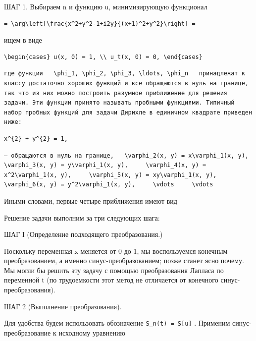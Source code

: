 \documentclass[
  ukrainian,
]{article}
\begin{document}
ШАГ 1. Выбираем n и функцию u, минимизирующую функционал

\begin{verbatim}
= \arg\left[\frac{x^2+y^2-1+i2y}{(x+1)^2+y^2}\right] =
\end{verbatim}

ищем в виде

\begin{verbatim}
\begin{cases} u(x, 0) = 1, \\ u_t(x, 0) = 0, \end{cases}
\end{verbatim}

\begin{verbatim}
где функции   \phi_1, \phi_2, \phi_3, \ldots, \phi_n   принадлежат к классу достаточно хороших функций и все обращаются в нуль на границе, так что из них можно построить разумное приближение для решения задачи. Эти функции принято называть пробными функциями. Типичный набор пробных функций для задачи Дирихле в единичном квадрате приведен ниже:
\end{verbatim}

\begin{verbatim}
x^{2} + y^{2} = 1,
\end{verbatim}

\begin{verbatim}
— обращаются в нуль на границе,   \varphi_2(x, y) = x\varphi_1(x, y),     \varphi_3(x, y) = y\varphi_1(x, y),     \varphi_4(x, y) = x^2\varphi_1(x, y),     \varphi_5(x, y) = xy\varphi_1(x, y),     \varphi_6(x, y) = y^2\varphi_1(x, y),     \vdots     \vdots
\end{verbatim}

Иными словами, первые четыре приближения имеют вид

Решение задачи выполним за три следующих шага:

ШАГ І (Определение подходящего преобразования.)

Поскольку переменная x меняется от 0 до 1, мы воспользуемся конечным
преобразованием, а именно синус-преобразованием; позже станет ясно
почему. Мы могли бы решить эту задачу с помощью преобразования Лапласа
по переменной t (по трудоемкости этот метод не отличается от конечного
синус-преобразования).

ШАГ 2 (Выполнение преобразования).

Для удобства будем использовать обозначение
\texttt{S\_n(t)\ =\ S{[}u{]}} . Применим синус-преобразование к
исходному уравнению
\end{document}
